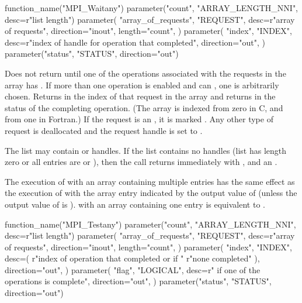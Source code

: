 \begin{mpi-binding}
    function_name("MPI_Waitany")
    parameter("count", "ARRAY_LENGTH_NNI", desc=r"list length")
    parameter(
        "array_of_requests",
        "REQUEST",
        desc=r"array of requests",
        direction="inout",
        length="count",
    )
    parameter(
        "index",
        "INDEX",
        desc=r"index of handle for operation that completed",
        direction="out",
    )
    parameter("status", "STATUS", direction="out")
\end{mpi-binding}

Does not return until 
one of the operations associated with the 
requests in the array has .
If more than one operation is
enabled and can , one is arbitrarily chosen.
Returns in  the index
of that request in the array and returns in  the status of the
completing operation.
(The array is indexed from zero in C, and from one in Fortran.)
If the request
is an  , it is marked .  Any other type of
request
is deallocated and the request handle is set to .

The  list may contain  or 
handles.
If the list contains no  handles (list has length zero or all
entries are  or ),
then the call returns immediately with
\mpicode{ = }, and an  .

The execution of
with an array containing multiple entries
has the same effect as the execution of
with the array entry indicated by the output value of 
(unless the output value of  is ).
 with an array containing one  entry
is equivalent to .

\begin{mpi-binding}
    function_name("MPI_Testany")
    parameter("count", "ARRAY_LENGTH_NNI", desc=r"list length")
    parameter(
        "array_of_requests",
        "REQUEST",
        desc=r"array of requests",
        direction="inout",
        length="count",
    )
    parameter(
        "index",
        "INDEX",
        desc=(
            r"index of operation that completed or  if "
            r"none completed"
        ),
        direction="out",
    )
    parameter(
        "flag",
        "LOGICAL",
        desc=r" if one of the operations is complete",
        direction="out",
    )
    parameter("status", "STATUS", direction="out")
\end{mpi-binding}

